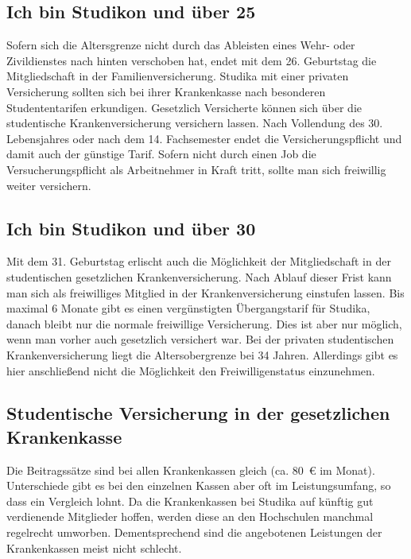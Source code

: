 \subsection*{Ich bin Studikon und über 25}

Sofern sich die Altersgrenze nicht durch das Ableisten eines Wehr-
oder Zivildienstes nach hinten verschoben hat, endet mit dem
26. Geburtstag die Mitgliedschaft in der Familienversicherung. 
Studika mit einer privaten Versicherung sollten sich bei ihrer
Krankenkasse nach besonderen Studententarifen erkundigen. Gesetzlich
Versicherte können sich über die studentische
Krankenversicherung versichern lassen. Nach Vollendung des 30. Lebensjahres
oder nach dem 14. Fachsemester endet die Versicherungspflicht und damit
auch der günstige Tarif. Sofern nicht durch einen Job die Versucherungspflicht
als Arbeitnehmer in Kraft tritt, sollte man sich freiwillig
weiter versichern.

\subsection*{Ich bin Studikon und über 30}

Mit dem 31. Geburtstag erlischt auch die Möglichkeit der
Mitgliedschaft in der studentischen gesetzlichen
Krankenversicherung. Nach Ablauf dieser Frist kann man sich 
als freiwilliges Mitglied in der Krankenversicherung einstufen lassen. 
Bis maximal 6 Monate gibt es einen vergünstigten Übergangstarif für
Studika, danach bleibt nur die normale freiwillige Versicherung.
Dies ist aber nur möglich, wenn
man vorher auch gesetzlich versichert war. Bei der privaten
studentischen Krankenversicherung liegt die Altersobergrenze bei 34
Jahren. Allerdings gibt es hier anschließend nicht die Möglichkeit den
Freiwilligenstatus einzunehmen.

\subsection*{Studentische Versicherung in der gesetzlichen Krankenkasse}

Die Beitragssätze sind bei allen Krankenkassen gleich (ca. 80~€ im
Monat). Unterschiede gibt es bei den einzelnen Kassen aber oft im
Leistungsumfang, so dass ein Vergleich lohnt. Da die Krankenkassen bei
Studika auf künftig gut verdienende Mitglieder hoffen, werden
diese an den Hochschulen manchmal regelrecht umworben. Dementsprechend
sind die angebotenen Leistungen der Krankenkassen meist nicht
schlecht.

